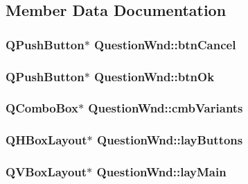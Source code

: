\subsection{Member Data Documentation}
\hypertarget{class_question_wnd_ae018059487d2e6dccf8d62a353443919}{
\subsubsection[{btnCancel}]{\setlength{\rightskip}{0pt plus 5cm}QPushButton$\ast$ {\bf QuestionWnd::btnCancel}}}
\label{class_question_wnd_ae018059487d2e6dccf8d62a353443919}
\hypertarget{class_question_wnd_a865ece947ae7cf9b28f442c8f48dc436}{
\subsubsection[{btnOk}]{\setlength{\rightskip}{0pt plus 5cm}QPushButton$\ast$ {\bf QuestionWnd::btnOk}}}
\label{class_question_wnd_a865ece947ae7cf9b28f442c8f48dc436}
\hypertarget{class_question_wnd_a9c51d03b7798ae2c904bcb348a364200}{
\subsubsection[{cmbVariants}]{\setlength{\rightskip}{0pt plus 5cm}QComboBox$\ast$ {\bf QuestionWnd::cmbVariants}}}
\label{class_question_wnd_a9c51d03b7798ae2c904bcb348a364200}
\hypertarget{class_question_wnd_a811bc74af624b7324280e0a7ef1518da}{
\subsubsection[{layButtons}]{\setlength{\rightskip}{0pt plus 5cm}QHBoxLayout$\ast$ {\bf QuestionWnd::layButtons}}}
\label{class_question_wnd_a811bc74af624b7324280e0a7ef1518da}
\hypertarget{class_question_wnd_a6f71d0746090cbab4b0940ea78580a6a}{
\subsubsection[{layMain}]{\setlength{\rightskip}{0pt plus 5cm}QVBoxLayout$\ast$ {\bf QuestionWnd::layMain}}}
